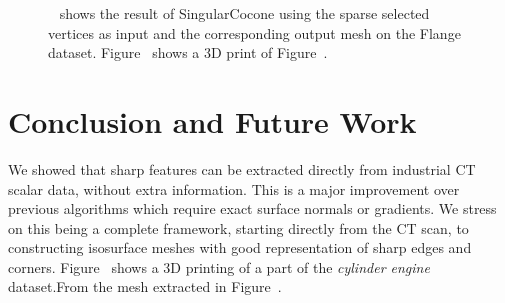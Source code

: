  \begin{figure}[htb]
     \centering
     \caption{ ~\protect{} shows the result of SingularCocone using the sparse selected vertices as input and the corresponding output mesh on the Flange dataset.
          Figure~\protect{} shows a 3D print of Figure~\protect{}.
}
     \label{fig:fandisk}
    \end{figure}
    
\section{Conclusion and Future Work}

We showed that sharp features can be extracted directly 
from industrial CT scalar data, without extra information.
This is a major improvement over previous algorithms which require
exact surface normals or gradients.
We stress on this being a complete framework, starting directly from the CT scan, to constructing isosurface meshes with good representation of sharp edges and corners. 
Figure~ shows a 3D printing of a part of the \emph{cylinder engine} dataset.From the  mesh extracted in Figure~.
